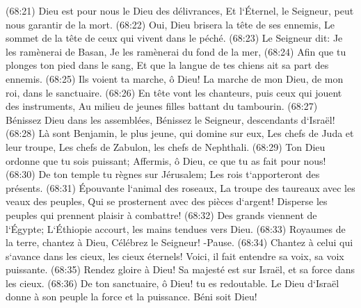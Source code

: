\verse (68:21) Dieu est pour nous le Dieu des délivrances, Et l`Éternel, le Seigneur, peut nous garantir de la mort. 
\verse (68:22) Oui, Dieu brisera la tête de ses ennemis, Le sommet de la tête de ceux qui vivent dans le péché. 
\verse (68:23) Le Seigneur dit: Je les ramènerai de Basan, Je les ramènerai du fond de la mer, 
\verse (68:24) Afin que tu plonges ton pied dans le sang, Et que la langue de tes chiens ait sa part des ennemis. 
\verse (68:25) Ils voient ta marche, ô Dieu! La marche de mon Dieu, de mon roi, dans le sanctuaire. 
\verse (68:26) En tête vont les chanteurs, puis ceux qui jouent des instruments, Au milieu de jeunes filles battant du tambourin. 
\verse (68:27) Bénissez Dieu dans les assemblées, Bénissez le Seigneur, descendants d`Israël! 
\verse (68:28) Là sont Benjamin, le plus jeune, qui domine sur eux, Les chefs de Juda et leur troupe, Les chefs de Zabulon, les chefs de Nephthali. 
\verse (68:29) Ton Dieu ordonne que tu sois puissant; Affermis, ô Dieu, ce que tu as fait pour nous! 
\verse (68:30) De ton temple tu règnes sur Jérusalem; Les rois t`apporteront des présents. 
\verse (68:31) Épouvante l`animal des roseaux, La troupe des taureaux avec les veaux des peuples, Qui se prosternent avec des pièces d`argent! Disperse les peuples qui prennent plaisir à combattre! 
\verse (68:32) Des grands viennent de l`Égypte; L`Éthiopie accourt, les mains tendues vers Dieu. 
\verse (68:33) Royaumes de la terre, chantez à Dieu, Célébrez le Seigneur! -Pause. 
\verse (68:34) Chantez à celui qui s`avance dans les cieux, les cieux éternels! Voici, il fait entendre sa voix, sa voix puissante. 
\verse (68:35) Rendez gloire à Dieu! Sa majesté est sur Israël, et sa force dans les cieux. 
\verse (68:36) De ton sanctuaire, ô Dieu! tu es redoutable. Le Dieu d`Israël donne à son peuple la force et la puissance. Béni soit Dieu! 

